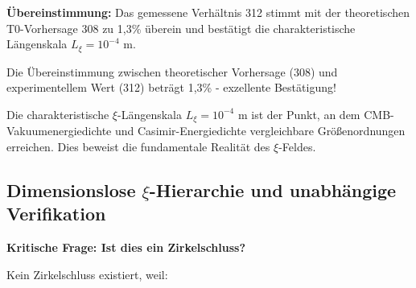 \documentclass[12pt,a4paper]{article}
\begin{document}
	\textbf{Übereinstimmung:} Das gemessene Verhältnis 312 stimmt mit der theoretischen T0-Vorhersage 308 zu 1,3\% überein und bestätigt die charakteristische Längenskala $L_\xi = 10^{-4}$ m.
	
	Die Übereinstimmung zwischen theoretischer Vorhersage (308) und experimentellem Wert (312) beträgt 1,3\% - exzellente Bestätigung!
	
	\begin{important}
		Die charakteristische $\xi$-Längenskala $L_\xi = 10^{-4}$ m ist der Punkt, an dem CMB-Vakuumenergiedichte und Casimir-Energiedichte vergleichbare Größ{}enordnungen erreichen. Dies beweist die fundamentale Realität des $\xi$-Feldes.
	\end{important}
	
	\subsection{Dimensionslose $\xi$-Hierarchie und unabhängige Verifikation}
	
	\textbf{Kritische Frage: Ist dies ein Zirkelschluss?}
	
	Kein Zirkelschluss existiert, weil:
	
\end{document}
